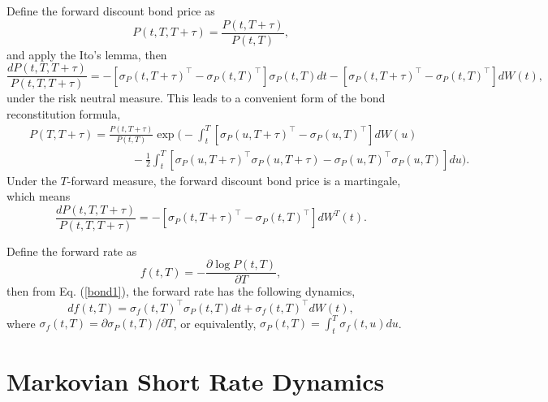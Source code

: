 \documentclass[12pt]{article}
\begin{document}
  Define the forward discount bond price as
  \begin{equation}
    P(t,T,T+\tau)=\frac{P(t,T+\tau)}{P(t,T)},
  \end{equation}
  and apply the Ito's lemma, then
  \begin{equation}
    \label{bond2}
    \frac{dP(t,T,T+\tau)}{P(t,T,T+\tau)}=-\left[\sigma_P(t,T+\tau)^{\top}-\sigma_P(t,T)^{\top}\right]\sigma_P(t,T)dt
                                        -\left[\sigma_P(t,T+\tau)^{\top}-\sigma_P(t,T)^{\top}\right]dW(t),
  \end{equation}
  under the risk neutral measure. This leads to a convenient form of the bond reconstitution formula,
  \begin{eqnarray}
    \label{reconstitution00}
    &&P(T,T+\tau)=\frac{P(t,T+\tau)}{P(t,T)}\exp\Bigg(-\int_t^T\left[\sigma_P(u,T+\tau)^{\top}-\sigma_P(u,T)^{\top}\right]dW(u)\nonumber\\
    &&\quad\quad\quad\quad\quad\quad\quad\quad\quad
          -\frac{1}{2}\int_t^T\left[\sigma_P(u,T+\tau)^{\top}\sigma_P(u,T+\tau)-\sigma_P(u,T)^{\top}\sigma_P(u,T)\right]du\Bigg).
  \end{eqnarray}
  Under the $T$-forward measure, the forward discount bond price is a martingale,
  which means
  \begin{equation}
    \label{bond3}
    \frac{dP(t,T,T+\tau)}{P(t,T,T+\tau)}=-\left[\sigma_P(t,T+\tau)^{\top}-\sigma_P(t,T)^{\top}\right]dW^T(t).
  \end{equation}


  Define the forward rate as
  \begin{equation}
    f(t,T)=-\frac{\partial\log P(t,T)}{\partial T},
  \end{equation}
  then from Eq. (\ref{bond1}), the forward rate has the following dynamics,
  \begin{equation}
    \label{rate}
    df(t,T)=\sigma_f(t,T)^{\top}\sigma_P(t,T)dt+\sigma_f(t,T)^{\top}dW(t),
  \end{equation}
  where $\sigma_f(t,T)=\partial\sigma_P(t,T)/\partial T$, or equivalently,
  $\sigma_P(t,T)=\int_t^T\sigma_f(t,u)du$.


\section{Markovian Short Rate Dynamics}
\end{document}
